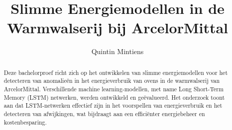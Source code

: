 \documentclass[a0,portrait]{hogent-poster}
\title{Slimme Energiemodellen in de Warmwalserij bij ArcelorMittal}
\subtitle{}
\author{Quintin Mintiens}
\begin{document}
\maketitle

\begin{abstract}
Deze bachelorproef richt zich op het ontwikkelen van slimme energiemodellen voor het detecteren van anomalieën in het energieverbruik van ovens in de warmwalserij van ArcelorMittal. Verschillende machine learning-modellen, met name Long Short-Term Memory (LSTM) netwerken, werden ontwikkeld en geëvalueerd. Het onderzoek toont aan dat LSTM-netwerken effectief zijn in het voorspellen van energieverbruik en het detecteren van afwijkingen, wat bijdraagt aan een efficiënter energiebeheer en kostenbesparing.
\end{abstract}
\end{document}
